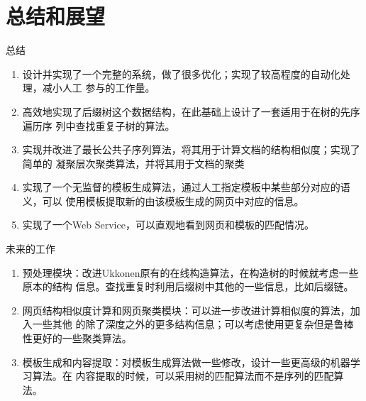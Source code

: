 \documentclass[presentation]{beamer}
\begin{document}
\section{总结和展望}
\label{sec-4}
\begin{frame}[label=sec-4-1]{总结}
\begin{enumerate}
\item 设计并实现了一个完整的系统，做了很多优化；实现了较高程度的自动化处理，减小人工
参与的工作量。
\item 高效地实现了后缀树这个数据结构，在此基础上设计了一套适用于在树的先序遍历序
列中查找重复子树的算法。
\item 实现并改进了最长公共子序列算法，将其用于计算文档的结构相似度；实现了简单的
凝聚层次聚类算法，并将其用于文档的聚类
\item 实现了一个无监督的模板生成算法，通过人工指定模板中某些部分对应的语义，可以
使用模板提取新的由该模板生成的网页中对应的信息。
\item 实现了一个Web Service，可以直观地看到网页和模板的匹配情况。
\end{enumerate}
\end{frame}
\begin{frame}[label=sec-4-2]{未来的工作}
\begin{enumerate}
\item 预处理模块：改进Ukkonen原有的在线构造算法，在构造树的时候就考虑一些原本的结构
信息。查找重复时利用后缀树中其他的一些信息，比如后缀链。
\item 网页结构相似度计算和网页聚类模块：可以进一步改进计算相似度的算法，加入一些其他
的除了深度之外的更多结构信息；可以考虑使用更复杂但是鲁棒性更好的一些聚类算法。
\item 模板生成和内容提取：对模板生成算法做一些修改，设计一些更高级的机器学习算法。在
内容提取的时候，可以采用树的匹配算法而不是序列的匹配算法。
\end{enumerate}
\end{frame}
\end{document}
